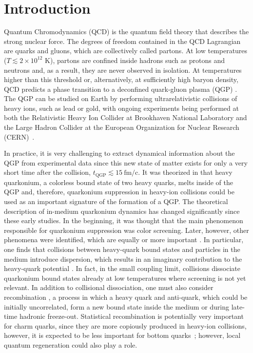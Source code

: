 \documentclass[times,sort&compress,final]{elsarticle}
\begin{document}

\section{Introduction}
\label{sec:intro}

Quantum Chromodynamics (QCD) is the quantum field theory that describes the strong nuclear force. 
The degrees of freedom contained in the QCD Lagrangian are quarks and gluons, which are collectively called partons.  
At low temperatures ($T \lesssim 2 \times 10^{12}$ K), partons are confined inside hadrons such as protons and neutrons and, as a result, they are never observed in isolation. 
At temperatures higher than this threshold or, alternatively, at sufficiently high baryon density, QCD predicts a phase transition to a deconfined quark-gluon plasma (QGP) \cite{Bazavov:2013txa,Borsanyi:2016bzg,Bazavov:2020teh}. 
The QGP can be studied on Earth by performing ultrarelativistic collisions of heavy ions, such as lead or gold, with ongoing experiments being performed at both the Relativistic Heavy Ion Collider at Brookhaven National Laboratory and the Large Hadron Collider at the European Organization
for Nuclear Research (CERN)~\cite{Averbeck2015,Busza:2018}. 

In practice, it is very challenging to extract dynamical information about the QGP from experimental data since this new state of matter exists for only a very short time after the collision, $t_\text{QGP} \lesssim 15\ \text{fm/c}$. 
It was theorized in \cite{Matsui:1986dk,Karsch:1987pv} that heavy quarkonium, a colorless bound state of two heavy quarks, melts inside of the QGP and, therefore, quarkonium suppression in heavy-ion collisions could be used as an important signature of the formation of a QGP. 
The theoretical description of in-medium quarkonium dynamics has changed significantly since these early studies. 
In the beginning, it was thought that the main phenomenon responsible for quarkonium suppression was color screening. Later, however, other phenomena were identified, which are equally or more important \cite{Laine:2006ns,Strickland:2011mw,Rothkopf:2019ipj,Akamatsu:2020ypb,Rothkopf:2020vfz}. 
In particular, one finds that collisions between heavy-quark bound states and particles in the medium introduce dispersion, which results in an imaginary contribution to the heavy-quark potential \cite{Laine:2006ns}. 
In fact, in the small coupling limit, collisions dissociate quarkonium bound states already at low temperatures where screening is not yet relevant. 
In addition to collisional dissociation, one must also consider recombination \cite{BraunMunzinger:2000px,Thews:2000rj}, a process in which a heavy quark and anti-quark, which could be initially uncorrelated, form a new bound state inside the medium or during late-time hadronic freeze-out.  
Statistical recombination is potentially very important for charm quarks, since they are more copiously produced in heavy-ion collisions, however, it is expected to be less important for bottom quarks~\cite{Emerick:2011xu}; however, local quantum regeneration could also play a role.
\end{document}
